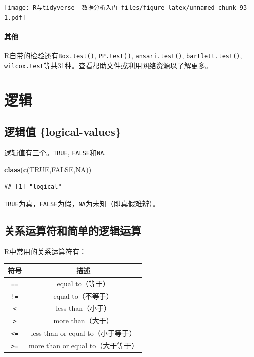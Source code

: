 \documentclass[]{book}
\newenvironment{Shaded}{\begin{snugshade}}{\end{snugshade}}
\newcommand{\KeywordTok}[1]{\textcolor[rgb]{0.13,0.29,0.53}{\textbf{#1}}}
\newcommand{\NormalTok}[1]{#1}
\newcommand{\OtherTok}[1]{\textcolor[rgb]{0.56,0.35,0.01}{#1}}
\let\oldparagraph\paragraph
\renewcommand{\paragraph}[1]{\oldparagraph{#1}\mbox{}}
\begin{document}
\texttt{[image: R与tidyverse——数据分析入门\_files/figure-latex/unnamed-chunk-93-1.pdf]}

\paragraph{其他}

R自带的检验还有\texttt{Box.test()}, \texttt{PP.test()}, \texttt{ansari.test()}, \texttt{bartlett.test()}, \texttt{wilcox.test}等共31种。查看帮助文件或利用网络资源以了解更多。

\hypertarget{logical-operation}{%
\section{逻辑}\label{logical-operation}}

\hypertarget{-logical-values}{%
\subsection{逻辑值 \{logical-values\}}\label{-logical-values}}

逻辑值有三个。\texttt{TRUE}, \texttt{FALSE}和\texttt{NA}.

\begin{Shaded}
\begin{Highlighting}[]
\KeywordTok{class}\NormalTok{(}\KeywordTok{c}\NormalTok{(}\OtherTok{TRUE}\NormalTok{,}\OtherTok{FALSE}\NormalTok{,}\OtherTok{NA}\NormalTok{))}
\end{Highlighting}
\end{Shaded}

\begin{verbatim}
## [1] "logical"
\end{verbatim}

\texttt{TRUE}为真，\texttt{FALSE}为假，\texttt{NA}为未知（即真假难辨）。

\hypertarget{logical-operations}{%
\subsection{关系运算符和简单的逻辑运算}\label{logical-operations}}

R中常用的关系运算符有：

\begin{longtable}[]{@{}cc@{}}
\toprule
符号 & 描述\tabularnewline
\midrule
\endhead
\texttt{==} & equal to（等于）\tabularnewline
\texttt{!=} & equal to（不等于）\tabularnewline
\texttt{\textless{}} & less than（小于）\tabularnewline
\texttt{\textgreater{}} & more than（大于）\tabularnewline
\texttt{\textless{}=} & less than or equal to（小于等于）\tabularnewline
\texttt{\textgreater{}=} & more than or equal to（大于等于）\tabularnewline
\bottomrule
\end{longtable}
\end{document}
